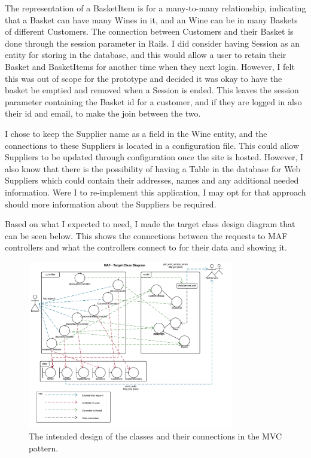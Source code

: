 \documentclass[12pt]{article}
\begin{document}
The representation of a BasketItem is for a many-to-many relationship, indicating that a Basket can have many Wines in it, and an Wine can be in many Baskets of different Customers. The connection between Customers and their Basket is done through the session parameter in Rails. I did consider having Session as an entity for storing in the database, and this would allow a user to retain their Basket and BasketItems for another time when they next login. However, I felt this was out of scope for the prototype and decided it was okay to have the basket be emptied and removed when a Session is ended. This leaves the session parameter containing the Basket id for a customer, and if they are logged in also their id and email, to make the join between the two.

I chose to keep the Supplier name as a field in the Wine entity, and the connections to these Suppliers is located in a configuration file. This could allow Suppliers to be updated through configuration once the site is hosted. However, I also know that there is the possibility of having a Table in the database for Web Suppliers which could contain their addresses, names and any additional needed information. Were I to re-implement this application, I may opt for that approach should more information about the Suppliers be required.

Based on what I expected to need, I made the target class design diagram that can be seen below. This shows the connections between the requests to MAF controllers and what the controllers connect to for their data and showing it.

\begin{figure}[H]
        \centering
                \includegraphics[width=0.8\textwidth]{assets/MAF_Target_Class_Design}
                \caption{The intended design of the classes and their connections in the MVC pattern.}
                \label{fig: Target Class Diagram.} 
\end{figure}
\end{document}
